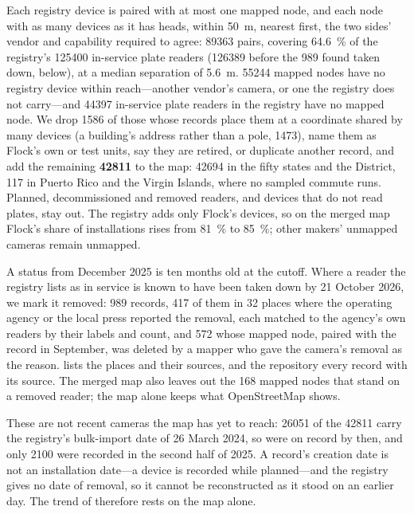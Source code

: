 \documentclass[11pt,twoside]{article}
\begin{document}
Each registry device is paired with at most one mapped node, and each node with as many
devices as it has heads, within \SI{50}{\metre}, nearest first, the two sides' vendor and
capability required to agree: \num{89363} pairs, covering \SI{64.6}{\percent} of the
registry's \num{125400} in-service plate readers (\num{126389} before the \num{989} found
taken down, below), at a median separation of
\SI{5.6}{\metre}. \num{55244} mapped nodes have no registry device within reach---another
vendor's camera, or one the registry does not carry---and \num{44397} in-service plate readers
in the registry have no mapped node. We drop \num{1586} of those whose records place them at a
coordinate shared by many devices (a building's address rather than a pole, \num{1473}), name
them as Flock's own or test units, say they are retired, or duplicate another record, and add
the remaining \textbf{\num{42811}} to the map: \num{42694} in the fifty states and the
District, 117 in Puerto Rico and the Virgin Islands, where no sampled commute runs. Planned,
decommissioned and removed readers, and devices that do not read plates, stay out. The registry adds
only Flock's devices, so on the merged map Flock's share of installations rises from
\SI{81}{\percent} to \SI{85}{\percent}; other makers' unmapped cameras remain unmapped.

A status from December 2025 is ten months old at the cutoff. Where a reader the registry lists
as in service is known to have been taken down by 21 October 2026, we mark it removed:
\num{989} records, \num{417} of them in 32 places where the operating agency or the local
press reported the removal, each matched to the agency's own readers by their labels and
count, and \num{572} whose mapped node, paired with the record in September, was deleted by a
mapper who gave the camera's removal as the reason.  lists the places and
their sources, and the repository every record with its source. The merged map also leaves out
the 168 mapped nodes that stand on a removed reader; the map alone keeps what OpenStreetMap
shows.

These are not recent cameras the map has yet to reach: \num{26051} of the \num{42811} carry
the registry's bulk-import date of 26 March 2024, so were on record by then, and only
\num{2100} were recorded in the second half of 2025. A record's creation date is not an
installation date---a device is recorded while planned---and the registry gives no date of
removal, so it cannot be reconstructed as it stood on an earlier day. The trend of
 therefore rests on the map alone.
\end{document}
